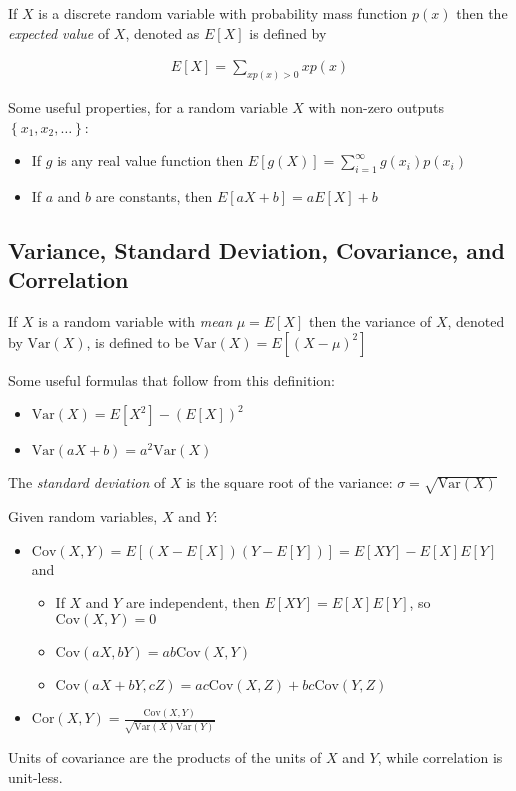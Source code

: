 \documentclass[10pt]{article}
\theoremstyle{definition}
\theoremstyle{theorem}
\begin{document}
		If $X$ is a discrete random variable with probability mass function $p(x)$ then the \emph{expected value} of $X$, denoted as $E[X]$ is defined by
		
		\begin{align*}
			E[X] = \sum_{xp(x)>0}xp(x)
		\end{align*}
		
		Some useful properties, for a random variable $X$ with non-zero outputs $\left\{ x_1, x_2, \ldots \right\}$: 
		
		\begin{itemize}
			\item If $g$ is any real value function then $E[g(X)] =  \sum_{i=1}^{\infty}g(x_i)p(x_i)$
			\item If $a$ and $b$ are constants, then $E[aX+b] = aE[X] + b $
		\end{itemize}
		
		\subsection*{Variance, Standard Deviation, Covariance, and Correlation}
		
		If $X$ is a random variable with \emph{mean} $\mu=E[X]$ then the variance of $X$, denoted by $\text{Var}(X)$, is defined to be $\text{Var}(X) = E[(X-\mu)^2]$
		
		Some useful formulas that follow from this definition:
		\begin{multicols}{2}
			\begin{itemize}
				\item $\text{Var}(X) = E[X^2] - (E[X])^2$
				\item $\text{Var}(aX + b) = a^2 \text{Var}(X)$
			\end{itemize}
		\end{multicols}
		
		The \emph{standard deviation} of $X$ is the square root of the variance: $\sigma = \sqrt{\text{Var}(X)}$
		
		Given random variables, $X$ and $Y$:
		\begin{itemize}
			\item $\text{Cov}(X,Y)=E[(X-E[X])(Y-E[Y])]=E[XY]-E[X]E[Y]$ and
			\begin{itemize}
				\item If $X$ and $Y$ are independent, then $E[XY]=E[X]E[Y]$, so $\text{Cov}(X,Y) = 0$
				\item $\text{Cov}(aX,bY)=ab\text{Cov}(X,Y)$
				\item $\text{Cov}(aX+bY,cZ)=ac\text{Cov}(X,Z) + bc\text{Cov}(Y,Z)$
			\end{itemize}
			\item $\text{Cor}(X,Y) =\frac{ \text{Cov}(X,Y)}{\sqrt{\text{Var}(X)\text{Var}(Y)}}$
		\end{itemize} 
		Units of covariance are the products of the units of $X$ and $Y$, while correlation is unit-less.
		
\end{document}
